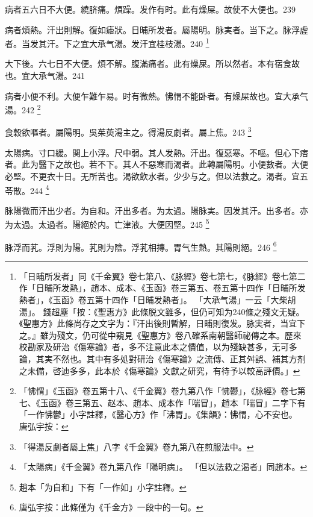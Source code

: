 病者五六日不大便。繞脐痛。煩躁。发作有时。此有燥屎。故使不大便也。239

病者煩熱。汗出則解。復如瘧狀。日晡所发者。屬陽明。脉実者。当下之。脉浮虗者。当发其汗。下之宜{\khaai 大}承气湯。发汗宜桂枝湯。240
	\footnote{
		「日晡所发者」同《千金翼》卷七第八、《脉經》卷七第七，《脉經》卷七第二作「日晡所发熱」，趙本、成本、《玉函》卷三第五、卷五第十四作「日晡所发熱者」，《玉函》卷五第十四作「日晡发熱者」。
		「大承气湯」一云「大柴胡湯」。
		錢超塵「按：《聖惠方》此條脱文雖多，但仍可知为240條之殘文无疑。《聖惠方》此條尚存之文字为：『汗出後則暫解，日晡則復发。脉実者，当宜下之。』雖为殘文，仍可從中窺見《聖惠方》卷八確系南朝醫師祕傳之本。歷來校勘家及研治《傷寒論》者，多不注意此本之價值，以为殘缺甚多，无可多論，其実不然也。其中有多処對研治《傷寒論》之流傳、正其舛誤、補其方剂之未備，啓迪多多，此本於《傷寒論》文獻之研究，有待予以較高評價。」
	}

%

大下後。六七日不大便。煩不解。腹滿痛者。此有燥屎。所以然者。本有宿食故也。宜{\khaai 大}承气湯。241

病者小便不利。大便乍難乍易。时有微熱。怫㥜不能卧者。有燥屎故也。宜{\khaai 大}承气湯。242
	\footnote{
		「怫㥜」《玉函》卷五第十八、《千金翼》卷九第八作「怫鬱」，《脉經》卷七第七、《玉函》卷三第五、赵本、趙本、成本作「喘冒」，趙本「喘冒」二字下有「一作怫鬱」小字註釋，《醫心方》作「沸胃」。《集韻》：怫㥜，心不安也。
		唐弘宇按：
	}

食穀欲嘔者。屬陽明。吳茱萸湯主之。{\khaai 得湯反劇者。屬上焦。}243
	\footnote{
		「得湯反劇者屬上焦」八字《千金翼》卷九第八在煎服法中。
	}

太陽病。寸{\khaai 口}緩。関{\khaai 上小}浮。尺{\khaai 中}弱。其人发熱。汗出。復惡寒。不嘔。但心下痞者。此为醫下之故也。若不下。其人不惡寒而渴者。此轉屬陽明。小便數者。大便必堅。不更衣十日。无所苦也。{\khaai 渴}欲飲水者。少少与之。但以法救之。渴者。宜五苓散。244
	\footnote{
		「太陽病」《千金翼》卷九第八作「陽明病」。
		「但以法救之渴者」同趙本。
	}

脉陽微而汗出少者。为自和。汗出多者。为太過。陽脉実。因发其汗。出多者。亦为太過。太過者。陽絕於内。亡津液。大便因堅。245
	\footnote{
		趙本「为自和」下有「一作如」小字註釋。
	}

脉浮而芤。浮{\khaai 則}为陽。芤{\khaai 則}为陰。浮芤相摶。胃气生熱。其陽則絕。246
	\footnote{
		唐弘宇按：此條僅为《千金方》一段中的一句。
	}

